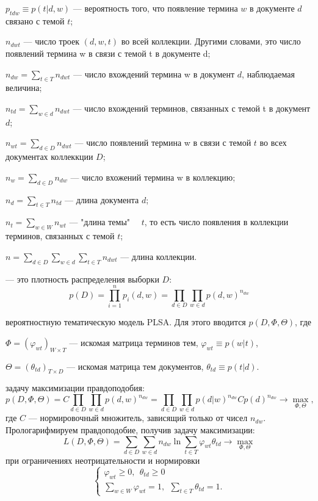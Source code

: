 \documentclass[12pt]{article}
\renewcommand{\geq}{\geqslant}
\renewcommand{\phi}{\varphi}
\begin{document}
$p_{tdw} \equiv p(t|d,w)$ --- вероятность того, что появление термина $w$ в документе $d$ связано с темой $t$;

$n_{dwt}$ --- число троек $(d,w,t)$ во всей коллекции. Другими словами, это число появлений термина w в связи с темой t в документе d;

$n_{dw} = \sum_{t \in T} n_{dwt}$ --- число вхождений термина w в документ $d$,  наблюдаемая величина;

$n_{td} = \sum_{w \in d} n_{dwt}$ --- число вхождений  терминов, связанных с темой t в документ $d$;

$n_{wt} = \sum_{d \in D} n_{dwt}$ --- число появлений термина w в связи с темой $t$ во всех документах коллеккции $D$;

$n_{w} = \sum_{d \in D} n_{dw}$ --- число вхожений термина w в коллекцию;

$n_{d} = \sum_{t \in T} n_{td}$ --- длина документа $d$;

$n_{t} = \sum_{w \in W} n_{wt}$ --- "длина темы" \ \ $t$, то есть число появления в коллекции терминов, связанных с темой $t$;

$n = \sum_{d \in D}\sum_{w \in d}\sum_{t \in T} n_{dwt}$ --- длина коллекции.

 ---  это плотность распределения выборки $D$:
\[
p(D)=\prod^n_{i=1}p_i(d,w)=\prod_{d \in D}\prod_{w \in d}p(d,w)^{n_{dw}}
\]

 вероятностную тематическую модель PLSA. Для этого вводится $p(D,\Phi,\Theta)$, где 

$\Phi=(\phi_{wt})_{W \times T}$ --- искомая матрица терминов тем, $\phi_{wt} \equiv p(w|t)$,

$\Theta=(\theta_{td})_{T \times D}$ --- искомая матрица тем документов, $\theta_{td}\equiv p(t|d)$.

 задачу максимизации правдоподобия:
\[
p(D,\Phi,\Theta)=C\prod_{d \in D}\prod_{w \in d}p(d,w)^{n_{dw}}=\prod_{d \in D}\prod_{w \in d}p(d|w)^{n_{dw}}Cp(d)^{n_{dw}} \to \max_{\Phi,\Theta},
\]
где $C$ --- нормировочный множитель, зависящий только от чисел $n_{dw}$. Прологарифмируем правдоподобие, получив задачу максимизации:
\[
L(D,\Phi,\Theta)=\sum_{d \in D}\sum_{w \in d}n_{dw}\ln\sum_{t \in T}\phi_{wt}\theta_{td} \to \max_{\Phi,\Theta}
\]
при ограничениях неотрицательности и нормировки
\[
\left\{
	\begin{aligned}
		\phi_{wt} \geq 0,~~\theta_{td} \geq 0\\
		\sum_{w \in W} \phi_{wt} = 1,~~\sum_{t \in T} \theta_{td}  = 1.
	\end{aligned}
\right.
\]
\end{document}
